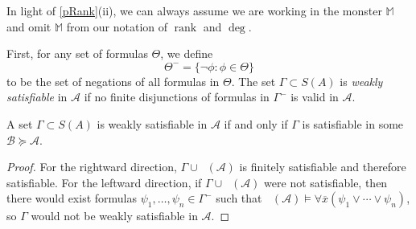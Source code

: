 \documentclass{article}
\newcommand\monster{\mathbb{M}}
\DeclareMathOperator{\Diagel}{Diag_{el}}
\DeclareMathOperator{\rank}{rank}
\let\mc\mathcal
\begin{document}
In light of \ref{pRank}(ii), we can always assume we are working in the monster $\monster$ and omit $\monster$ from our notation of $\rank$ and $\deg$.

\begin{definition}
    First, for any set of formulas $\Theta$, we define
    \[ \Theta^{-} = \{ \neg \phi : \phi \in \Theta \} \]
    to be the set of negations of all formulas in $\Theta$. The set $\Gamma \subset S(A)$ is \textit{weakly satisfiable} in $\mc{A}$ if no finite disjunctions of formulas in $\Gamma^{-}$ is valid in $\mc{A}$.
\end{definition}

\begin{remark}\label{wSat}
    A set $\Gamma \subset S(A)$ is weakly satisfiable in $\mc{A}$ if and only if $\Gamma$ is satisfiable in some $\mc{B} \succeq \mc{A}$.
\end{remark}
\begin{proof}
    For the rightward direction, $\Gamma \cup \Diagel(\mc{A})$ is finitely satisfiable and therefore satisfiable. For the leftward direction, if $\Gamma \cup \Diagel(\mc{A})$ were not satisfiable, then there would exist formulas $\psi_1, \ldots, \psi_n \in \Gamma^{-}$ such that $\Diagel(\mc{A}) \vDash \forall \overline{x} (\psi_1 \lor \cdots \lor \psi_n)$, so $\Gamma$ would not be weakly satisfiable in $\mc{A}$.
\end{proof}

    
\end{document}
